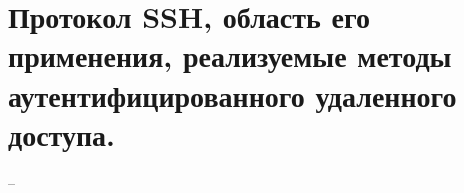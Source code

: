 \section{Протокол SSH, область его применения, реализуемые методы аутентифицированного удаленного доступа.}

--